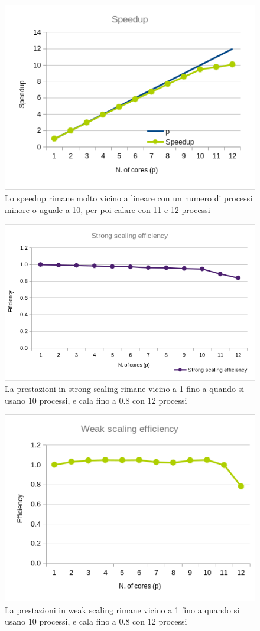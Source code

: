 \documentclass[a4paper,11pt, twoside]{report}
\begin{document}
\begin{figure}[H]
    \includegraphics[scale=0.5]{images/mpi_speedup.png}
    \caption[]{Lo speedup rimane molto vicino a lineare con un numero di processi minore o uguale a 10, per poi calare con 11 e 12 processi}
\end{figure}
\begin{figure}[H]
    \includegraphics[scale=0.5]{images/mpi_strong.png}
    \caption[short]{La prestazioni in strong scaling rimane vicino a 1 fino a quando si usano 10 processi, e cala fino a 0.8 con 12 processi}
\end{figure}
\begin{figure}[H]
    \includegraphics[scale=0.5]{images/mpi_weak.png}
    \caption[short]{La prestazioni in weak scaling rimane vicino a 1 fino a quando si usano 10 processi, e cala fino a 0.8 con 12 processi}
\end{figure}
\end{document}
